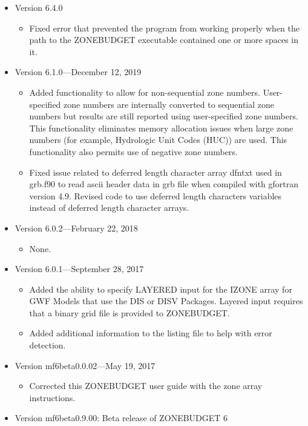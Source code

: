 \documentclass[11pt,twoside,twocolumn]{usgsreport}
\begin{document}
\begin{itemize}


\item Version 6.4.0
\begin{itemize}
  \item Fixed error that prevented the program from working properly when the path to the ZONEBUDGET executable contained one or more spaces in it.
\end{itemize}

\item Version 6.1.0---December 12, 2019
\begin{itemize}
  \item Added functionality to allow for non-sequential zone numbers. User-specified zone numbers are internally converted to sequential zone numbers but results are still reported using user-specified zone numbers. This functionality eliminates memory allocation issues when large zone numbers (for example, Hydrologic Unit Codes (HUC)) are used. This functionality also permits use of negative zone numbers.
  \item Fixed issue related to deferred length character array dfntxt used in grb.f90 to read ascii header data in grb file when compiled with gfortran version 4.9. Revised code to use deferred length characters variables instead of deferred length character arrays.
\end{itemize}

\item Version 6.0.2---February 22, 2018
\begin{itemize}
  \item None.
\end{itemize}

\item Version 6.0.1---September 28, 2017
\begin{itemize}
  \item Added the ability to specify LAYERED input for the IZONE array for GWF Models that use the DIS or DISV Packages.  Layered input requires that a binary grid file is provided to ZONEBUDGET.
  \item Added additional information to the listing file to help with error detection.
\end{itemize}

\item Version mf6beta0.0.02---May 19, 2017
\begin{itemize}
  \item Corrected this ZONEBUDGET user guide with the zone array instructions.
\end{itemize}

\item
Version mf6beta0.9.00:  Beta release of ZONEBUDGET 6

\end{itemize}
\end{document}
